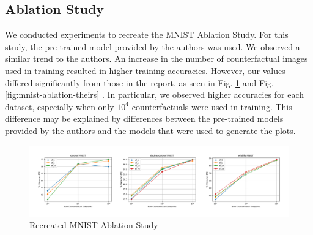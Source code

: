 \newpage
\begin{appendices}
  
\section{Ablation Study}

We conducted experiments to recreate the MNIST Ablation Study. For this study, the pre-trained model provided by the authors was used. We observed a similar trend to the authors. An increase in the number of counterfactual images used in training resulted in higher training accuracies. However, our values differed significantly from those in the report, as seen in Fig. \ref{fig:mnist-ablation-ours} and Fig.  \ref{fig:mnist-ablation-theirs} . In particular, we observed higher accuracies for each dataset, especially when only $10^4$ counterfactuals were used in training. This difference may be explained by differences between the pre-trained models provided by the authors and the models that were used to generate the plots.

\begin{figure}[ht!]
    \centering
    \includegraphics[width = 15cm]{images/ablation.png}
    \caption{Recreated MNIST Ablation Study}
    \label{fig:mnist-ablation-ours}
\end{figure}



\end{appendices}
